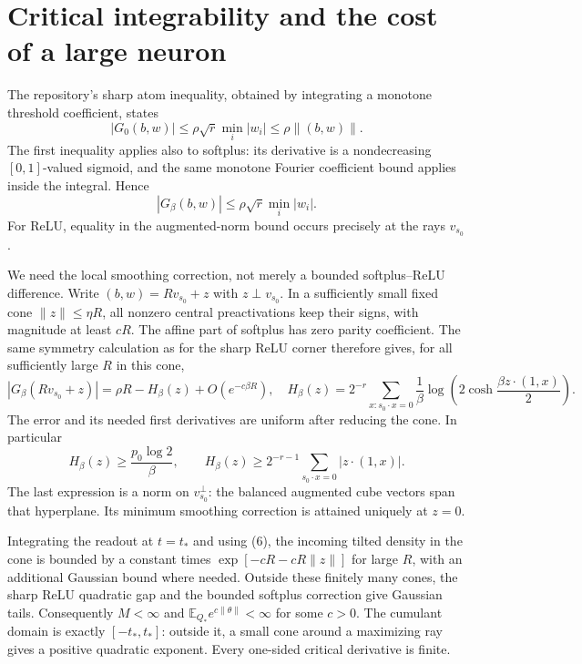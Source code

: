 \documentclass[11pt]{article}
\newcommand{\E}{\mathbb E}\newcommand{\R}{\mathbb R}\newcommand{\Pp}{\mathbb P}
\begin{document}
\section{Critical integrability and the cost of a large neuron}
The repository's sharp atom inequality, obtained by integrating a
monotone threshold coefficient, states
\[
 |G_0(b,w)|\le\rho\sqrt r\min_i|w_i|\le\rho\|(b,w)\|.
\]
The first inequality applies also to softplus: its derivative is a
nondecreasing $[0,1]$-valued sigmoid, and the same monotone Fourier
coefficient bound applies inside the integral. Hence
\[
 |G_\beta(b,w)|\le\rho\sqrt r\min_i|w_i|.                   \tag{5}
\]
For ReLU, equality in the augmented-norm bound occurs precisely at
the rays $v_{s_0}$.

We need the local smoothing correction, not merely a bounded
softplus--ReLU difference. Write $(b,w)=Rv_{s_0}+z$ with
$z\perp v_{s_0}$. In a sufficiently small fixed cone $\|z\|\le\eta R$,
all nonzero central preactivations keep their signs, with magnitude
at least $cR$. The affine part of softplus has zero parity coefficient.
The same symmetry calculation as for the sharp ReLU corner therefore
gives, for all sufficiently large $R$ in this cone,
\[
 |G_\beta(Rv_{s_0}+z)|=\rho R-H_\beta(z)+O(e^{-c\beta R}),
 \quad
 H_\beta(z)=2^{-r}\sum_{x:s_0\cdot x=0}
       \frac1\beta\log\left(2\cosh\frac{\beta z\cdot(1,x)}2\right).
                                                               \tag{6}
\]
The error and its needed first derivatives are uniform after reducing
the cone. In particular
\[
 H_\beta(z)\ge\frac{p_0\log2}{\beta},\qquad
 H_\beta(z)\ge2^{-r-1}\sum_{s_0\cdot x=0}|z\cdot(1,x)|.
\]
The last expression is a norm on $v_{s_0}^{\perp}$: the balanced
augmented cube vectors span that hyperplane. Its minimum smoothing
correction is attained uniquely at $z=0$.

Integrating the readout at $t=t_*$ and using (6), the incoming tilted
density in the cone is bounded by a constant times
$\exp[-cR-cR\|z\|]$ for large $R$, with an additional Gaussian
bound where needed. Outside these finitely many cones, the sharp
ReLU quadratic gap and the bounded softplus correction give Gaussian
tails. Consequently $M<\infty$ and
$\E_{Q_*}e^{c\|\theta\|}<\infty$ for some $c>0$.
The cumulant domain is exactly $[-t_*,t_*]$: outside it, a small cone
around a maximizing ray gives a positive quadratic exponent.
Every one-sided critical derivative is finite.
\end{document}
